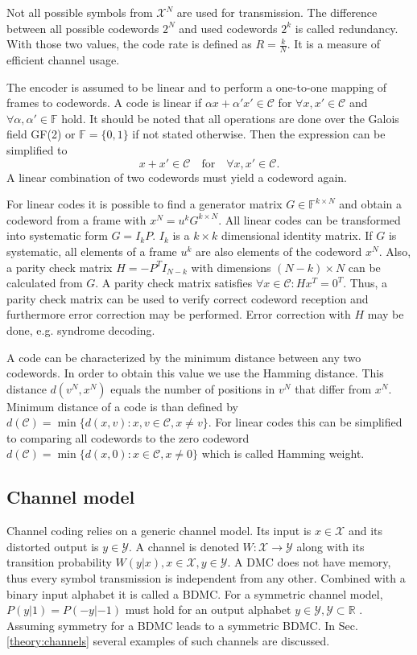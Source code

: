 Not all possible symbols from $\mathcal{X}^N$ are used for transmission.
The difference between all possible codewords $2^N$ and used codewords $2^k$ is called redundancy.
With those two values, the code rate is defined as $R = \frac{k}{N}$.
It is a measure of efficient channel usage.

The encoder is assumed to be linear and to perform a one-to-one mapping of frames to codewords.
A code is linear if $\alpha x + \alpha' x' \in \mathcal{C}$ for $\forall x, x' \in \mathcal{C}$ and $\forall \alpha, \alpha' \in \mathbb{F}$ hold.
It should be noted that all operations are done over the Galois field GF(2) or $\mathbb{F} = \{0, 1\}$ if not stated otherwise.
Then the expression can be simplified to 
\begin{equation}
 x + x' \in \mathcal{C} \quad \textrm{for} \quad \forall x, x' \in \mathcal{C}.
\end{equation}
A linear combination of two codewords must yield a codeword again.

For linear codes it is possible to find a generator matrix $G \in \mathbb{F}^{k \times N}$ and obtain a codeword from a frame with $x^N = u^k G^{k \times N}$.
All linear codes can be transformed into systematic form $G = I_k P$.
$I_k$ is a $k \times k$ dimensional identity matrix.
If $G$ is systematic, all elements of a frame $u^k$ are also elements of the codeword $x^N$.
Also, a parity check matrix $H = -P^T I_{N-k}$ with dimensions $(N-k) \times N$ can be calculated from $G$.
A parity check matrix satisfies $\forall x \in \mathcal{C}: H x^T = 0^T $.
Thus, a parity check matrix can be used to verify correct codeword reception and furthermore error correction may be performed.
Error correction with $H$ may be done, e.g. syndrome decoding.

A code can be characterized by the minimum distance between any two codewords.
In order to obtain this value we use the Hamming distance.
This distance $d(v^N,x^N)$ equals the number of positions in $v^N$ that differ from $x^N$.
Minimum distance of a code is than defined by $d(\mathcal{C}) = \min\{d(x,v): x,v \in \mathcal{C}, x \neq v\}$.
For linear codes this can be simplified to comparing all codewords to the zero codeword $d(\mathcal{C}) = \min\{d(x,0): x \in \mathcal{C}, x \neq 0\}$ which is called Hamming weight.

\subsection{Channel model}\label{sec:channel_model}
Channel coding relies on a generic channel model.
Its input is $x \in \mathcal{X}$ and its distorted output is $y \in \mathcal{Y}$.
A channel is denoted $W: \mathcal{X} \rightarrow \mathcal{Y}$ along with its transition probability $W(y|x), x \in \mathcal{X}, y \in \mathcal{Y}$.
A \ac{DMC} does not have memory, thus every symbol transmission is independent from any other.
Combined with a binary input alphabet it is called a \ac{BDMC}.
For a symmetric channel model, $P(y|1) = P(-y|-1)$ must hold for an output alphabet $y \in \mathcal{Y}, \mathcal{Y} \subset \mathbb{R}$ \cite{Richardson:2008:MCT}.
Assuming symmetry for a \ac{BDMC} leads to a symmetric \ac{BDMC}.
In Sec. \ref{theory:channels} several examples of such channels are discussed.

